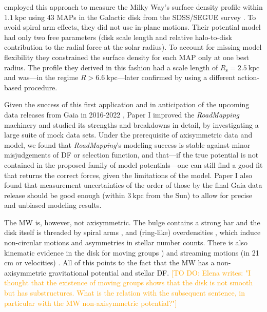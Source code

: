 \documentclass[iop,revtex4,numberedappendix,appendixfloats]{emulateapj}
\newcommand{\RM}{{\sl RoadMapping}}
\newcommand{\Elena}[1]{\textcolor{Orange}{#1}}
\begin{document}
\citet{2013ApJ...779..115B} employed this approach to measure the Milky Way's surface density profile within $1.1~\text{kpc}$ using 43 MAPs in the Galactic disk from the SDSS/SEGUE survey \citep{2009AJ....137.4377Y}. To avoid spiral arm effects, they did not use in-plane motions. Their potential model had only two free parameters (disk scale length and relative halo-to-disk contribution to the radial force at the solar radius). To account for missing model flexibility they constrained the surface density for each MAP only at one best radius. The profile they derived in this fashion had a scale length of $R_\text{s}=2.5~\text{kpc}$ and was---in the regime $R>6.6~\text{kpc}$---later confirmed by \citet{2014MNRAS.445.3133P} using a different action-based procedure.

Given the success of this first application and in anticipation of the upcoming data releases from Gaia in 2016-2022 \citep{2013CEAB...37..115E}, Paper I improved the \RM{} machinery and studied its strengths and breakdowns in detail, by investigating a large suite of mock data sets. Under the prerequisite of axisymmetric data and model, we found that \RM{}'s modeling success is stable against minor misjudgements of DF or selection function, and that---if the true potential is not contained in the proposed family of model potentials---one can still find a good fit that returns the correct forces, given the limitations of the model. Paper I also found that measurement uncertainties of the order of those by the final Gaia data release should be good enough (within $3~\text{kpc}$ from the Sun) to allow for precise and unbiased modeling results. 

The MW is, however, not axisymmetric. The bulge contains a strong bar \citep{1980ApJ...236..779L,1991ApJ...379..631B,1991MNRAS.252..210B,1997MNRAS.288..365B,2000MNRAS.317L..45H,2013MNRAS.435.1874W} and the disk itself is threaded by spiral arms \citep{1958MNRAS.118..379O,1976A&A....49...57G,2009PASP..121..213C,2014ApJ...783..130R}, and (ring-like) overdensities \citep{2002ApJ...569..245N,2008ApJ...673..864J,2015ApJ...801..105X}, which induce non-circular motions and asymmetries in stellar number counts. There is also kinematic evidence in the disk for moving groups \citep{1998AJ....115.2384D,2005A&A...430..165F,2009ApJ...700.1794B,2010ApJ...717..617B}) and streaming motions (in 21 cm or velocities) \citep{2015ApJ...800...83B,2013MNRAS.436..101W,2012MNRAS.425.2335S}. All of this points to the fact that the MW has a non-axisymmetric gravitational potential and stellar DF. \Elena{[TO DO: Elena writes: "I thought that the existence of moving groups shows that the disk is not smooth but has substructures. What is the relation with the subsequent sentence, in particular with the MW non-axisymmetric potential?"]}
\end{document}
